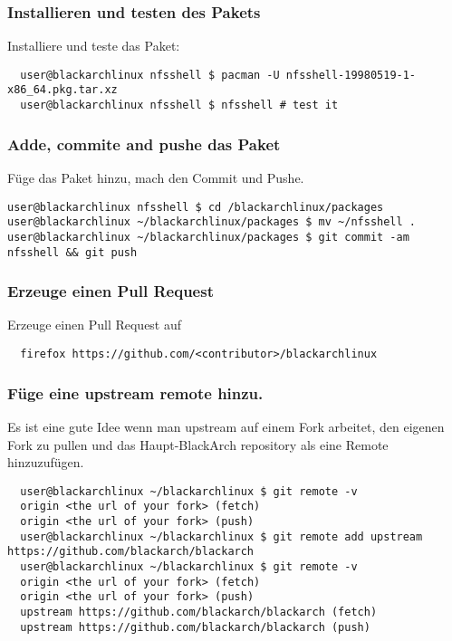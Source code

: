 \documentclass[a4paper, oneside, 11pt]{book}
\def\href#1#2{\htmladdnormallink{#2}{#1}}
\begin{document}
\subsubsection{Installieren und testen des Pakets}
Installiere und teste das Paket:
\begin{lstlisting}
  user@blackarchlinux nfsshell $ pacman -U nfsshell-19980519-1-x86_64.pkg.tar.xz
  user@blackarchlinux nfsshell $ nfsshell # test it
\end{lstlisting}

\subsubsection{Adde, commite and pushe das Paket}
Füge das Paket hinzu, mach den Commit und Pushe.
\begin{lstlisting}user@blackarchlinux nfsshell $ cd /blackarchlinux/packages
user@blackarchlinux ~/blackarchlinux/packages $ mv ~/nfsshell .
user@blackarchlinux ~/blackarchlinux/packages $ git commit -am nfsshell && git push
\end{lstlisting}

\subsubsection{Erzeuge einen Pull Request}
Erzeuge einen Pull Request auf \href{https://github.com/}{github.com}
\begin{lstlisting}
  firefox https://github.com/<contributor>/blackarchlinux
\end{lstlisting}

\subsubsection{Füge eine upstream remote hinzu.}
Es ist eine gute Idee wenn man upstream auf einem Fork arbeitet, den eigenen Fork zu pullen und das Haupt-BlackArch repository 
als eine Remote hinzuzufügen.
\begin{lstlisting}
  user@blackarchlinux ~/blackarchlinux $ git remote -v
  origin <the url of your fork> (fetch)
  origin <the url of your fork> (push)
  user@blackarchlinux ~/blackarchlinux $ git remote add upstream https://github.com/blackarch/blackarch
  user@blackarchlinux ~/blackarchlinux $ git remote -v
  origin <the url of your fork> (fetch)
  origin <the url of your fork> (push)
  upstream https://github.com/blackarch/blackarch (fetch)
  upstream https://github.com/blackarch/blackarch (push)
\end{lstlisting}
\end{document}
